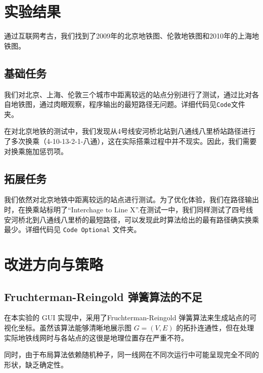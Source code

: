 	\section{实验结果}
	
	通过互联网考古，我们找到了2009年的北京地铁图、伦敦地铁图和2010年的上海地铁图。
	
	\subsection{基础任务}
	我们对北京、上海、伦敦三个城市中距离较远的站点分别进行了测试，通过比对各自地铁图，通过肉眼观察，程序输出的最短路径无问题。详细代码见\texttt{Code}文件夹。
	
	在对北京地铁的测试中，我们发现从4号线安河桥北站到八通线八里桥站路径进行了多次换乘（4-10-13-2-1-八通），这在实际搭乘过程中并不现实。因此，我们需要对换乘施加惩罚项。
	
	
	\subsection{拓展任务}
	我们依然对北京地铁中距离较远的站点进行测试。为了优化体验，我们在路径输出时，在换乘站标明了“Interchage to Line X”.在测试一中，我们同样测试了四号线安河桥北到八通线八里桥的最短路径，可以发现此时算法给出的最有路径确实换乘最少。详细代码见 \texttt{Code Optional} 文件夹。
	
	
	
	\section{改进方向与策略}
	
	\subsection{Fruchterman-Reingold 弹簧算法的不足}
	在本实验的 GUI 实现中，采用了Fruchterman-Reingold 弹簧算法来生成站点的可视化坐标。虽然该算法能够清晰地展示图 $G=(V, E)$ 的拓扑连通性，但在处理实际地铁线网时与各站点的这很是地理位置存在严重不符。
	
	同时，由于布局算法依赖随机种子，同一线网在不同次运行中可能呈现完全不同的形状，缺乏确定性。
	

